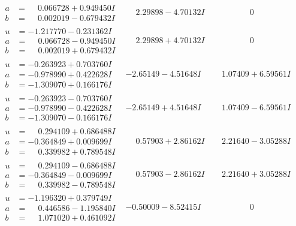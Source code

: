 \documentclass[1p]{elsarticle_modified}
\theoremstyle{definition}
\begin{document}
$$\begin{array}{c|c|c}
\begin{aligned}
a &= \phantom{-}0.066728 + 0.949450 I \\
b &= \phantom{-}0.002019 - 0.679432 I\end{aligned}
 & \phantom{-}2.29898 - 4.70132 I & \phantom{-0.000000 } 0 \\ \hline\begin{aligned}
u &= -1.217770 - 0.231362 I \\
a &= \phantom{-}0.066728 - 0.949450 I \\
b &= \phantom{-}0.002019 + 0.679432 I\end{aligned}
 & \phantom{-}2.29898 + 4.70132 I & \phantom{-0.000000 } 0 \\ \hline\begin{aligned}
u &= -0.263923 + 0.703760 I \\
a &= -0.978990 + 0.422628 I \\
b &= -1.309070 + 0.166176 I\end{aligned}
 & -2.65149 - 4.51648 I & \phantom{-}1.07409 + 6.59561 I \\ \hline\begin{aligned}
u &= -0.263923 - 0.703760 I \\
a &= -0.978990 - 0.422628 I \\
b &= -1.309070 - 0.166176 I\end{aligned}
 & -2.65149 + 4.51648 I & \phantom{-}1.07409 - 6.59561 I \\ \hline\begin{aligned}
u &= \phantom{-}0.294109 + 0.686488 I \\
a &= -0.364849 + 0.009699 I \\
b &= \phantom{-}0.339982 + 0.789548 I\end{aligned}
 & \phantom{-}0.57903 + 2.86162 I & \phantom{-}2.21640 - 3.05288 I \\ \hline\begin{aligned}
u &= \phantom{-}0.294109 - 0.686488 I \\
a &= -0.364849 - 0.009699 I \\
b &= \phantom{-}0.339982 - 0.789548 I\end{aligned}
 & \phantom{-}0.57903 - 2.86162 I & \phantom{-}2.21640 + 3.05288 I \\ \hline\begin{aligned}
u &= -1.196320 + 0.379749 I \\
a &= \phantom{-}0.446586 - 1.195840 I \\
b &= \phantom{-}1.071020 + 0.461092 I\end{aligned}
 & -0.50009 - 8.52415 I & \phantom{-0.000000 } 0 \\ \hline\begin{aligned}

\end{aligned}
\end{array}$$
\end{document}
